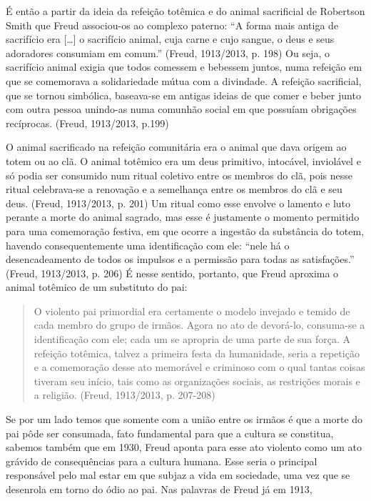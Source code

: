 É então a partir da ideia da refeição totêmica e do animal sacrificial
de Robertson Smith que Freud associou-os ao complexo paterno: ``A forma
mais antiga de sacrifício era {[}\ldots{}{]} o sacrifício animal, cuja carne
e cujo sangue, o deus e seus adoradores consumiam em comum.'' (Freud,
1913/2013, p. 198) Ou seja, o sacrifício animal exigia que todos
comessem e bebessem juntos, numa refeição em que se comemorava a
solidariedade mútua com a divindade. A refeição sacrificial, que se
tornou simbólica, baseava-se em antigas ideias de que comer e beber
junto com outra pessoa unindo-as numa comunhão social em que possuíam
obrigações recíprocas. (Freud, 1913/2013, p.199)

O animal sacrificado na refeição comunitária era o animal que dava
origem ao totem ou ao clã. O animal totêmico era um deus primitivo,
intocável, inviolável e só podia ser consumido num ritual coletivo entre
os membros do clã, pois nesse ritual celebrava-se a renovação e a
semelhança entre os membros do clã e seu deus. (Freud, 1913/2013, p.
201) Um ritual como esse envolve o lamento e luto perante a morte do
animal sagrado, mas esse é justamente o momento permitido para uma
comemoração festiva, em que ocorre a ingestão da substância do totem,
havendo consequentemente uma identificação com ele: ``nele há o
desencadeamento de todos os impulsos e a permissão para todas as
satisfações.'' (Freud, 1913/2013, p. 206) É nesse sentido, portanto, que
Freud aproxima o animal totêmico de um substituto do pai:

\begin{quote}
O violento pai primordial era certamente o modelo invejado e temido de
cada membro do grupo de irmãos. Agora no ato de devorá-lo, consuma-se a
identificação com ele; cada um se apropria de uma parte de sua força. A
refeição totêmica, talvez a primeira festa da humanidade, seria a
repetição e a comemoração desse ato memorável e criminoso com o qual
tantas coisas tiveram seu início, tais como as organizações sociais, as
restrições morais e a religião. (Freud, 1913/2013, p. 207-208)
\end{quote}

Se por um lado temos que somente com a união entre os irmãos é que a
morte do pai pôde ser consumada, fato fundamental para que a cultura se
constitua, sabemos também que em 1930, Freud aponta para esse ato
violento como um ato grávido de consequências para a cultura humana.
Esse seria o principal responsável pelo mal estar em que subjaz a vida
em sociedade, uma vez que se desenrola em torno do ódio ao pai. Nas
palavras de Freud já em 1913,

